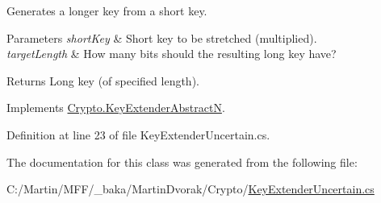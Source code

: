Generates a longer key from a short key. 


\begin{DoxyParams}{Parameters}
{\em short\+Key} & Short key to be stretched (multiplied).\\
\hline
{\em target\+Length} & How many bits should the resulting long key have?\\
\hline
\end{DoxyParams}
\begin{DoxyReturn}{Returns}
Long key (of specified length).
\end{DoxyReturn}


Implements \hyperlink{class_crypto_1_1_key_extender_abstract_n_a9df4156ad0a84730f87119e5a25cf1ef}{Crypto.\+Key\+Extender\+Abstract\+N}.



Definition at line 23 of file Key\+Extender\+Uncertain.\+cs.



The documentation for this class was generated from the following file\+:\begin{DoxyCompactItemize}
\item 
C\+:/\+Martin/\+M\+F\+F/\+\_\+baka/\+Martin\+Dvorak/\+Crypto/\hyperlink{_key_extender_uncertain_8cs}{Key\+Extender\+Uncertain.\+cs}\end{DoxyCompactItemize}

